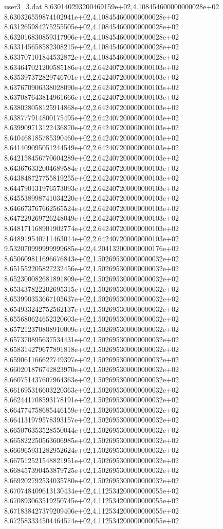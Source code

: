 \begin{filecontents}{user3_3.dat}
8.630140293200469159e+02,4.108454600000000028e+02
8.630326559874102941e+02,4.108454600000000028e+02
8.631265984275255505e+02,4.108454600000000028e+02
8.632016830859317906e+02,4.108454600000000028e+02
8.633145658582308215e+02,4.108454600000000028e+02
8.633707101844532872e+02,4.108454600000000028e+02
8.634647021200585186e+02,2.642407200000000103e+02
8.635397372829746701e+02,2.642407200000000103e+02
8.637670906338028090e+02,2.642407200000000103e+02
8.637087643814961666e+02,2.642407200000000103e+02
8.638028058125914868e+02,2.642407200000000103e+02
8.638777914800175495e+02,2.642407200000000103e+02
8.639909713122436870e+02,2.642407200000000103e+02
8.640468185785390460e+02,2.642407200000000103e+02
8.641409095051244549e+02,2.642407200000000103e+02
8.642158456770604289e+02,2.642407200000000103e+02
8.643676332004689584e+02,2.642407200000000103e+02
8.643848727755819255e+02,2.642407200000000103e+02
8.644790131976573093e+02,2.642407200000000103e+02
8.645538998741034220e+02,2.642407200000000103e+02
8.646673767662565524e+02,2.642407200000000103e+02
8.647229269726248049e+02,2.642407200000000103e+02
8.648171168901902774e+02,2.642407200000000103e+02
8.648919540711463014e+02,2.642407200000000103e+02
9.532070999999999685e+02,4.204132000000000176e+02
8.650609811696676843e+02,1.502695300000000032e+02
8.651552205827232456e+02,1.502695300000000032e+02
8.652300082681891809e+02,1.502695300000000032e+02
8.653437822202695315e+02,1.502695300000000032e+02
8.653990353667105637e+02,1.502695300000000032e+02
8.654933242752562137e+02,1.502695300000000032e+02
8.655680624652320603e+02,1.502695300000000032e+02
8.657212370808910009e+02,1.502695300000000032e+02
8.657370895637534431e+02,1.502695300000000032e+02
8.658314279677891818e+02,1.502695300000000032e+02
8.659061166622749397e+02,1.502695300000000032e+02
8.660201876742823970e+02,1.502695300000000032e+02
8.660751437607964363e+02,1.502695300000000032e+02
8.661695316603220363e+02,1.502695300000000032e+02
8.662441708593178191e+02,1.502695300000000032e+02
8.664774758685446159e+02,1.502695300000000032e+02
8.664131979578393157e+02,1.502695300000000032e+02
8.665076353528550044e+02,1.502695300000000032e+02
8.665822250563606985e+02,1.502695300000000032e+02
8.666965931282952624e+02,1.502695300000000032e+02
8.667512521548821951e+02,1.502695300000000032e+02
8.668457390453879725e+02,1.502695300000000032e+02
8.669202792534035780e+02,1.502695300000000032e+02
8.670748409613130434e+02,4.112534200000000055e+02
8.670893063519250745e+02,4.112534200000000055e+02
8.671838427379209406e+02,4.112534200000000055e+02
8.672583334504464574e+02,4.112534200000000055e+02

\end{filecontents}
